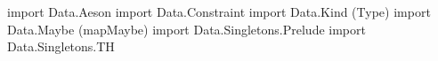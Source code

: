 \begin{code}
import Data.Aeson
import Data.Constraint
import Data.Kind (Type)
import Data.Maybe (mapMaybe)
import Data.Singletons.Prelude
import Data.Singletons.TH
\end{code}

